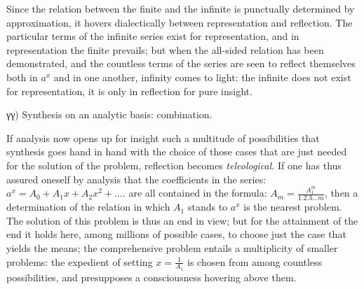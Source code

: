 \documentclass[12pt,a4paper,openany]{book}
\newcommand{\opage}[1]{\marginnote{\footnotesize\textit{[#1]}}}
\begin{document}
Since the relation between the finite and the infinite is punctually determined by approximation, it hovers dialectically between representation and reflection. The particular terms of the infinite series exist for representation, and in representation the finite prevails; but when the all-sided relation has been demonstrated, and the countless terms of the series are seen to reflect themselves both in $a^{x}$ and in one another, infinity comes to light: the infinite does not exist for representation, it is only in reflection for pure insight.

\begin{center}γγ) Synthesis on an analytic basis: combination.\end{center}

If analysis now opens up for insight such a multitude of possibilities that synthesis goes hand in hand with the choice of those cases that are just needed for the solution of the problem, reflection becomes \emph{teleological.} If one has thus assured oneself by analysis that the coefficients in the series: $a^{x}=A_{0}+A_{1}x+A_{2}x^{2}+\ldots.$ are all contained in the formula: $A_{m}=\frac{A_{1}^{m}}{1.2.3\ldots m}$, then a determination of the relation in which $A_{1}$ stands to $a^{x}$ is the nearest problem. The solution of this problem is thus an end in view; but for the attainment of the end it holds here, among millions of possible cases, to choose just the case that yields the means; the comprehensive problem
\setcounter{footnote}{0}%
\opage{47}entails a multiplicity of smaller problems: the expedient of setting $x=\frac{1}{A_{1}}$ is chosen from among countless possibilities, and presupposes a consciousness hovering above them.
\end{document}
